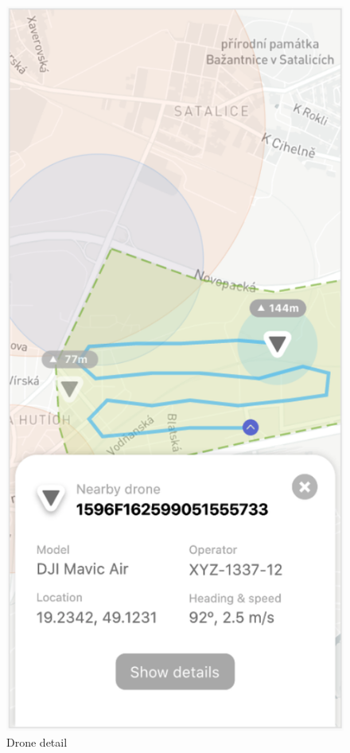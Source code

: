 \begin{figure}
\begin{minipage}{.4\textwidth}
        \includegraphics[width=.7\linewidth]{assets/user_interface_design/dashboard/dashboard_drone_detail.png}
        \caption{Drone detail}
        \label{fig:dashboard_drone_detail}
    \end{minipage}
    \label{fig:dashboard_all}
\end{figure}
